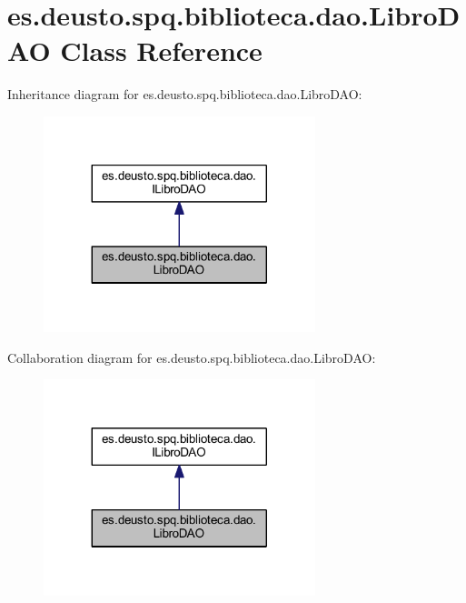 \hypertarget{classes_1_1deusto_1_1spq_1_1biblioteca_1_1dao_1_1_libro_d_a_o}{}\section{es.\+deusto.\+spq.\+biblioteca.\+dao.\+Libro\+D\+AO Class Reference}
\label{classes_1_1deusto_1_1spq_1_1biblioteca_1_1dao_1_1_libro_d_a_o}


Inheritance diagram for es.\+deusto.\+spq.\+biblioteca.\+dao.\+Libro\+D\+AO\+:
\nopagebreak
\begin{figure}[H]
\begin{center}
\leavevmode
\includegraphics[width=224pt]{classes_1_1deusto_1_1spq_1_1biblioteca_1_1dao_1_1_libro_d_a_o__inherit__graph}
\end{center}
\end{figure}


Collaboration diagram for es.\+deusto.\+spq.\+biblioteca.\+dao.\+Libro\+D\+AO\+:
\nopagebreak
\begin{figure}[H]
\begin{center}
\leavevmode
\includegraphics[width=224pt]{classes_1_1deusto_1_1spq_1_1biblioteca_1_1dao_1_1_libro_d_a_o__coll__graph}
\end{center}
\end{figure}
